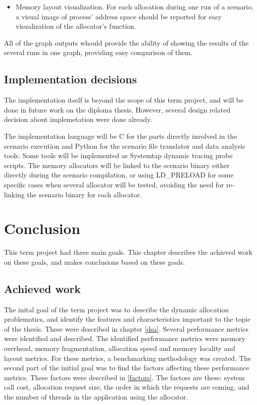 \begin{itemize}
\item Memory layout visualization. For each allocation during one run of a scenario, a visual image of process' address space should be reported for easy visualization of the allocator's function.  
\end{itemize}

All of the graph outputs whould provide the ability of showing the results of the several runs in one graph, providing easy comparison of them.

\section{Implementation decisions}
The implementation itself is beyond the scope of this term project, and will be done in future work on the diploma thesis. However, several design related decision about implemetation were done already.

The implementation language will be C for the parts directly involved in the scenario execution and Python for the scenario file translator and data analysis tools. Some tools will be implemented as Systemtap dynamic tracing probe scripts. The memory allocators will be linked to the scenario binary either directly during the scenario compilation, or using LD_PRELOAD for some specific cases when several allocator will be tested, avoiding the need for re-linking the scenario binary for each allocator. 

\chapter{Conclusion}

This term project had three main goals. This chapter describes the achieved work on these goals, and makes conclusions based on these goals.

\section{Achieved work}

The inital goal of the term project was to describe the dynamic allocation problematics, and identify the features and characteristics important to the topic of the thesis. These were described in chapter \ref{dsa}. Several performance metrics were identified and described. The identified performance metrics were memory overhead, memory fragmentation, allocation speed and memory locality and layout metrics. For these metrics, a benchmarking methodology was created. The second part of the initial goal was to find the factors affecting these performance metrics. These factors were described in \ref{factors}. The factors are these: system call cost, allocation request size, the order in which the requests are coming, and the number of threads in the application using the allocator.

